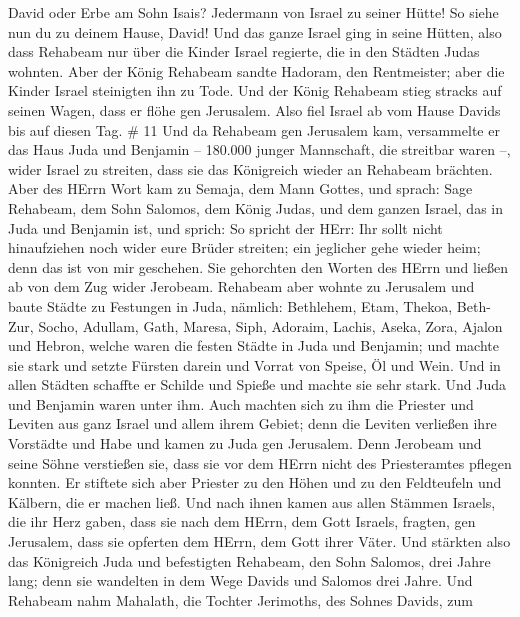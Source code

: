 David oder Erbe am Sohn Isais? Jedermann von Israel zu seiner Hütte! So
siehe nun du zu deinem Hause, David! Und das ganze Israel ging in seine
Hütten,  also dass Rehabeam nur über die Kinder Israel
regierte, die in den Städten Judas wohnten.  Aber der König
Rehabeam sandte Hadoram, den Rentmeister; aber die Kinder Israel
steinigten ihn zu Tode. Und der König Rehabeam stieg stracks auf seinen
Wagen, dass er flöhe gen Jerusalem.  Also fiel Israel ab
vom Hause Davids bis auf diesen Tag. \# 11  Und da Rehabeam
gen Jerusalem kam, versammelte er das Haus Juda und Benjamin -- 180.000
junger Mannschaft, die streitbar waren --, wider Israel zu streiten,
dass sie das Königreich wieder an Rehabeam brächten.  Aber
des HErrn Wort kam zu Semaja, dem Mann Gottes, und sprach: 
Sage Rehabeam, dem Sohn Salomos, dem König Judas, und dem ganzen Israel,
das in Juda und Benjamin ist, und sprich:  So spricht der
HErr: Ihr sollt nicht hinaufziehen noch wider eure Brüder streiten; ein
jeglicher gehe wieder heim; denn das ist von mir geschehen. Sie
gehorchten den Worten des HErrn und ließen ab von dem Zug wider
Jerobeam.  Rehabeam aber wohnte zu Jerusalem und baute
Städte zu Festungen in Juda,  nämlich: Bethlehem, Etam,
Thekoa,  Beth-Zur, Socho, Adullam,  Gath,
Maresa, Siph,  Adoraim, Lachis, Aseka,  Zora,
Ajalon und Hebron, welche waren die festen Städte in Juda und Benjamin;
 und machte sie stark und setzte Fürsten darein und Vorrat
von Speise, Öl und Wein.  Und in allen Städten schaffte er
Schilde und Spieße und machte sie sehr stark. Und Juda und Benjamin
waren unter ihm.  Auch machten sich zu ihm die Priester und
Leviten aus ganz Israel und allem ihrem Gebiet;  denn die
Leviten verließen ihre Vorstädte und Habe und kamen zu Juda gen
Jerusalem. Denn Jerobeam und seine Söhne verstießen sie, dass sie vor
dem HErrn nicht des Priesteramtes pflegen konnten.  Er
stiftete sich aber Priester zu den Höhen und zu den Feldteufeln und
Kälbern, die er machen ließ.  Und nach ihnen kamen aus
allen Stämmen Israels, die ihr Herz gaben, dass sie nach dem HErrn, dem
Gott Israels, fragten, gen Jerusalem, dass sie opferten dem HErrn, dem
Gott ihrer Väter.  Und stärkten also das Königreich Juda
und befestigten Rehabeam, den Sohn Salomos, drei Jahre lang; denn sie
wandelten in dem Wege Davids und Salomos drei Jahre.  Und
Rehabeam nahm Mahalath, die Tochter Jerimoths, des Sohnes Davids, zum
